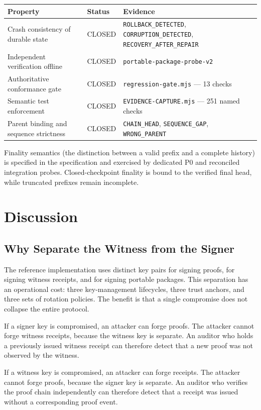 \documentclass[11pt,a4paper]{article}
\begin{document}
{\small
\begin{longtable}{@{}p{6cm}p{2cm}p{6cm}@{}}
\toprule
Property & Status & Evidence \\
\midrule
\endhead
Crash consistency of durable state & CLOSED & \texttt{ROLLBACK\_DETECTED}, \texttt{CORRUPTION\_DETECTED}, \texttt{RECOVERY\_AFTER\_REPAIR} \\
Independent verification offline & CLOSED & \texttt{portable-package-probe-v2} \\
Authoritative conformance gate & CLOSED & \texttt{regression-gate.mjs} --- 13 checks \\
Semantic test enforcement & CLOSED & \texttt{EVIDENCE-CAPTURE.mjs} --- 251 named checks \\
Parent binding and sequence strictness & CLOSED & \texttt{CHAIN\_HEAD}, \texttt{SEQUENCE\_GAP}, \texttt{WRONG\_PARENT} \\
\bottomrule
\end{longtable}
}

Finality semantics (the distinction between a valid prefix and a complete history) is specified in the specification and exercised by dedicated P0 and reconciled integration probes. Closed-checkpoint finality is bound to the verified final head, while truncated prefixes remain incomplete.
\section{Discussion}

\subsection{Why Separate the Witness from the Signer}

The reference implementation uses distinct key pairs for signing proofs, for signing witness receipts, and for signing portable packages. This separation has an operational cost: three key-management lifecycles, three trust anchors, and three sets of rotation policies. The benefit is that a single compromise does not collapse the entire protocol.

If a signer key is compromised, an attacker can forge proofs. The attacker cannot forge witness receipts, because the witness key is separate. An auditor who holds a previously issued witness receipt can therefore detect that a new proof was not observed by the witness.

If a witness key is compromised, an attacker can forge receipts. The attacker cannot forge proofs, because the signer key is separate. An auditor who verifies the proof chain independently can therefore detect that a receipt was issued without a corresponding proof event.
\end{document}
